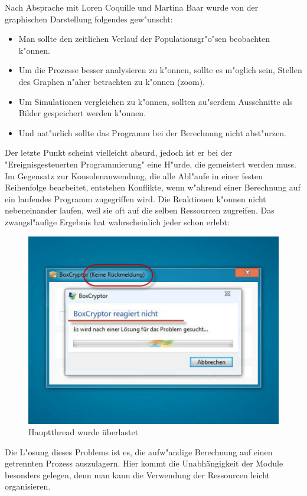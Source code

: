 \documentclass[11pt, a4paper, german]{article}
\theoremstyle{plain}
\begin{document}
	Nach Absprache mit Loren Coquille und Martina Baar wurde von der graphischen Darstellung folgendes gew"unscht:\\
	\begin{itemize}
		\item Man sollte den zeitlichen Verlauf der Populationsgr"o"sen beobachten k"onnen.
		\item Um die Prozesse besser analysieren zu k"onnen, sollte es m"oglich sein, Stellen des Graphen n"aher betrachten zu k"onnen (zoom).
		\item Um Simulationen vergleichen zu k"onnen, sollten au"serdem Ausschnitte als Bilder gespeichert werden k"onnen.
		\item Und nat"urlich sollte das Programm bei der Berechnung nicht abst"urzen.
	\end{itemize}
	Der letzte Punkt scheint vielleicht absurd, jedoch ist er bei der "{}Ereignisgesteuerten Programmierung"{} eine H"urde, die gemeistert werden muss.\\
	Im Gegensatz zur Konsolenanwendung, die alle Abl"aufe in einer festen Reihenfolge bearbeitet, entstehen Konflikte, wenn w"ahrend einer Berechnung auf ein laufendes Programm zugegriffen wird. Die Reaktionen k"onnen nicht nebeneinander laufen, weil sie oft auf die selben Ressourcen zugreifen. Das zwangsl"aufige Ergebnis hat wahrscheinlich jeder schon erlebt:
	\begin{figure}[H]
		\centering
		\includegraphics[width=0.7\linewidth]{./Pictures/KeineRueckmeldung}
		\caption[Keine Rueckmeldung]{Hauptthread wurde überlastet}
		\label{Keine Rueckmeldung}
	\end{figure}
	Die L"osung dieses Problems ist es, die aufw"andige Berechnung auf einen getrennten Prozess auszulagern. Hier kommt die Unabhängigkeit der Module besonders gelegen, denn man kann die Verwendung der Ressourcen leicht organisieren.\\
\end{document}
